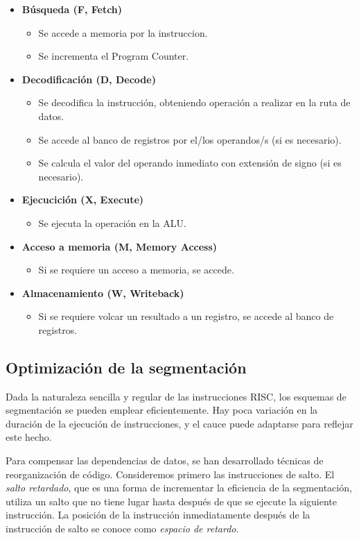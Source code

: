 \begin{itemize}
  \item \textbf{Búsqueda (F, Fetch)}
  \begin{itemize}
    \item Se accede a memoria por la instruccion.
    \item Se incrementa el Program Counter.
  \end{itemize}
  \item \textbf{Decodificación (D, Decode)}
  \begin{itemize}
    \item Se decodifica la instrucción, obteniendo operación a realizar en la ruta de datos.
    \item Se accede al banco de registros por el/los operandos/s (si es necesario).
    \item Se calcula el valor del operando inmediato con extensión de signo (si es necesario).
  \end{itemize}
  \item \textbf{Ejecucición (X, Execute)}
  \begin{itemize}
    \item Se ejecuta la operación en la ALU.
  \end{itemize}
  \item \textbf{Acceso a memoria (M, Memory Access)}
  \begin{itemize}
    \item Si se requiere un acceso a memoria, se accede.
  \end{itemize}
  \item \textbf{Almacenamiento (W, Writeback)}
  \begin{itemize}
    \item Si se requiere volcar un resultado a un registro, se accede al banco de registros.
  \end{itemize}
\end{itemize}

\subsection{Optimización de la segmentación}

Dada la naturaleza sencilla y regular de las instrucciones RISC, los esquemas de segmentación se pueden emplear eficientemente. Hay poca variación en la duración de la ejecución de instrucciones, y el cauce puede adaptarse para reflejar este hecho.

Para compensar las dependencias de datos, se han desarrollado técnicas de reorganización de código. Consideremos primero las instrucciones de salto. El \textit{salto retardado}, que es una forma de incrementar la eficiencia de la segmentación, utiliza un salto que no tiene lugar hasta después de que se ejecute la siguiente instrucción. La posición de la instrucción inmediatamente después de la instrucción de salto se conoce como \textit{espacio de retardo}.

